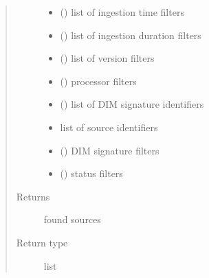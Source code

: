 \begin{fulllineitems}
\begin{fulllineitems}
\begin{quote}
\begin{description}
\begin{itemize}
\item {} 
 () \textendash{} list of ingestion time filters

\item {} 
 () \textendash{} list of ingestion duration filters

\item {} 
 () \textendash{} list of version filters

\item {} 
 () \textendash{} processor filters

\item {} 
 () \textendash{} list of DIM signature identifiers

\item {} 
 \textendash{} list of source identifiers

\item {} 
 () \textendash{} DIM signature filters

\item {} 
 () \textendash{} status filters

\end{itemize}

\item[{Returns}] \leavevmode
found sources

\item[{Return type}] \leavevmode
list

\end{description}\end{quote}

\end{fulllineitems}



\end{fulllineitems}
